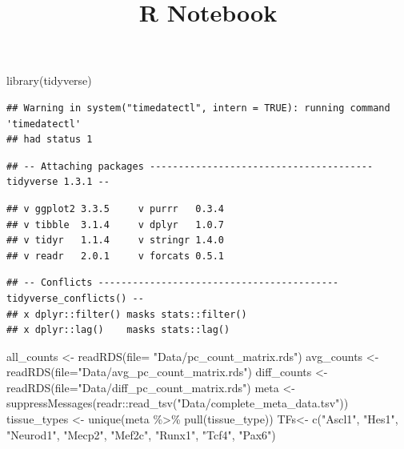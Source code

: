 \documentclass[
]{article}
\title{R Notebook}
\author{}
\date{\vspace{-2.5em}}
\newenvironment{Shaded}{\begin{snugshade}}{\end{snugshade}}
\newcommand{\AttributeTok}[1]{\textcolor[rgb]{0.77,0.63,0.00}{#1}}
\newcommand{\FunctionTok}[1]{\textcolor[rgb]{0.00,0.00,0.00}{#1}}
\newcommand{\NormalTok}[1]{#1}
\newcommand{\OtherTok}[1]{\textcolor[rgb]{0.56,0.35,0.01}{#1}}
\newcommand{\SpecialCharTok}[1]{\textcolor[rgb]{0.00,0.00,0.00}{#1}}
\newcommand{\StringTok}[1]{\textcolor[rgb]{0.31,0.60,0.02}{#1}}
\begin{document}
\maketitle

\begin{Shaded}
\begin{Highlighting}[]
\FunctionTok{library}\NormalTok{(tidyverse)}
\end{Highlighting}
\end{Shaded}

\begin{verbatim}
## Warning in system("timedatectl", intern = TRUE): running command 'timedatectl'
## had status 1
\end{verbatim}

\begin{verbatim}
## -- Attaching packages --------------------------------------- tidyverse 1.3.1 --
\end{verbatim}

\begin{verbatim}
## v ggplot2 3.3.5     v purrr   0.3.4
## v tibble  3.1.4     v dplyr   1.0.7
## v tidyr   1.1.4     v stringr 1.4.0
## v readr   2.0.1     v forcats 0.5.1
\end{verbatim}

\begin{verbatim}
## -- Conflicts ------------------------------------------ tidyverse_conflicts() --
## x dplyr::filter() masks stats::filter()
## x dplyr::lag()    masks stats::lag()
\end{verbatim}

\begin{Shaded}
\begin{Highlighting}[]
\NormalTok{all\_counts }\OtherTok{\textless{}{-}} \FunctionTok{readRDS}\NormalTok{(}\AttributeTok{file=} \StringTok{"Data/pc\_count\_matrix.rds"}\NormalTok{)}
\NormalTok{avg\_counts }\OtherTok{\textless{}{-}} \FunctionTok{readRDS}\NormalTok{(}\AttributeTok{file=}\StringTok{"Data/avg\_pc\_count\_matrix.rds"}\NormalTok{)}
\NormalTok{diff\_counts }\OtherTok{\textless{}{-}} \FunctionTok{readRDS}\NormalTok{(}\AttributeTok{file=}\StringTok{"Data/diff\_pc\_count\_matrix.rds"}\NormalTok{)}
\NormalTok{meta }\OtherTok{\textless{}{-}} \FunctionTok{suppressMessages}\NormalTok{(readr}\SpecialCharTok{::}\FunctionTok{read\_tsv}\NormalTok{(}\StringTok{"Data/complete\_meta\_data.tsv"}\NormalTok{))}
\NormalTok{tissue\_types }\OtherTok{\textless{}{-}} \FunctionTok{unique}\NormalTok{(meta }\SpecialCharTok{\%\textgreater{}\%} \FunctionTok{pull}\NormalTok{(tissue\_type))}
\NormalTok{TFs}\OtherTok{\textless{}{-}} \FunctionTok{c}\NormalTok{(}\StringTok{"Ascl1"}\NormalTok{, }\StringTok{"Hes1"}\NormalTok{, }\StringTok{"Neurod1"}\NormalTok{, }\StringTok{"Mecp2"}\NormalTok{, }\StringTok{"Mef2c"}\NormalTok{, }\StringTok{"Runx1"}\NormalTok{, }\StringTok{"Tcf4"}\NormalTok{, }\StringTok{"Pax6"}\NormalTok{)}
\end{Highlighting}
\end{Shaded}
\end{document}
